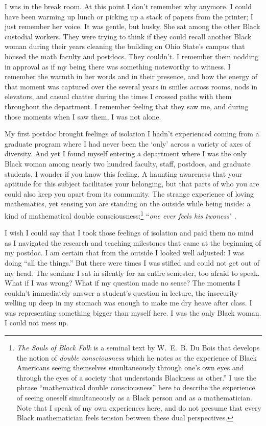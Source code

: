 \documentclass[pdflatex,sn-mathphys-num]{sn-jnl}%
\begin{document}
I was in the break room. At this point I don't remember why anymore. I could have been warming up lunch or picking up a stack of papers from the printer; I just remember her voice. It was gentle, but husky. She sat among the other Black custodial workers. They were trying to think if they could recall another Black woman during their years cleaning the building on Ohio State's campus that housed the math faculty and postdocs. They couldn't. I remember them nodding in approval as if my being there was something noteworthy to witness. I remember the warmth in her words and in their presence, and how the energy of that moment was captured over the several years in smiles across rooms, nods in elevators, and casual chatter during the times I crossed paths with them throughout the department. I remember feeling that they saw me, and during those moments when I saw them, I was not alone.

My first postdoc brought feelings of isolation I hadn't experienced coming from a graduate program where I had never been the `only' across a variety of axes of diversity. And yet I found myself entering a department where I was the only Black woman among nearly two hundred faculty, staff, postdocs, and graduate students. I wonder if you know this feeling. A haunting awareness that your aptitude for this subject facilitates your belonging, but that parts of who you are could also keep you apart from its community. The strange experience of loving mathematics, yet sensing you are standing on the outside while being inside: a kind of mathematical double consciousness:\footnote{\emph{The Souls of Black Folk} \cite{dubois1903souls} is a seminal text by W.~E.~B. Du Bois that develops the notion of \emph{double consciousness} which he notes as the experience of Black Americans seeing themselves simultaneously through one's own eyes and through the eyes of a society that understands Blackness as other.'' I use the phrase ``mathematical double consciousness'' here to describe the experience of seeing oneself simultaneously as a Black person and as a mathematician. Note that I speak of my own experiences here, and do not presume that every Black mathematician feels tension between these dual perspectives.} ``\emph{one ever feels his twoness}"  \cite{dubois1903souls}.


I wish I could say that I took those feelings of isolation and paid them no mind as I navigated the research and teaching milestones that came at the beginning of my postdoc. I am certain that from the outside I looked well adjusted: I was doing ``all the things.'' But there were times I was stifled and could not get out of my head. The seminar I sat in silently for an entire semester, too afraid to speak. What if I was wrong? What if my question made no sense? The moments I couldn't immediately answer a student's question in lecture, the insecurity welling up deep in my stomach was enough to make me dry heave after class. I was representing something bigger than myself here. I was the only Black woman. I could not mess up.
\end{document}
